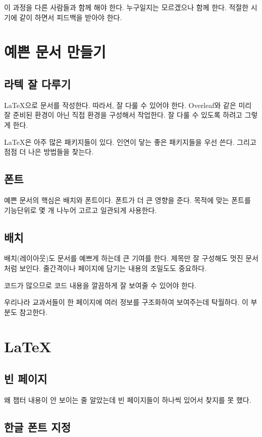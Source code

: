 이 과정을 다른 사람들과 함께 해야 한다. 누구일지는 모르겠으나 함께 한다. 적절한 시기에 
같이 하면서 피드백을 받아야 한다. 

\chapter{예쁜 문서 만들기}

\section{라텍 잘 다루기}

\LaTeX 으로 문서를 작성한다. 따라서, 잘 다룰 수 있어야 한다. Overleaf와 같은 미리 잘 준비된 
환경이 아닌 직접 환경을 구성해서 작업한다. 잘 다룰 수 있도록 하려고 그렇게 한다. 

\LaTeX 은 아주 많은 패키지들이 있다. 인연이 닿는 좋은 패키지들을 우선 쓴다. 그리고 점점 
더 나은 방법들을 찾는다. 

\section{폰트}

예쁜 문서의 핵심은 배치와 폰트이다. 폰트가 더 큰 영향을 준다. 목적에 맞는 폰트를 기능단위로 
몇 개 나누어 고르고 일관되게 사용한다. 

\section{배치}

배치(레이아웃)도 문서를 예쁘게 하는데 큰 기여를 한다. 제목만 잘 구성해도 멋진 문서처럼 
보인다. 줄간격이나 페이지에 담기는 내용의 조밀도도 중요하다. 

코드가 많으므로 코드 내용을 깔끔하게 잘 보여줄 수 있어야 한다. 

우리나라 교과서들이 한 페이지에 여러 정보를 구조화하여 보여주는데 탁월하다. 이 부분도 참고한다. 


\chapter{\LaTeX}

\section{빈 페이지}

왜 챕터 내용이 안 보이는 줄 알았는데 빈 페이지들이 하나씩 있어서 찾지를 못 했다. 

\section{한글 폰트 지정}

